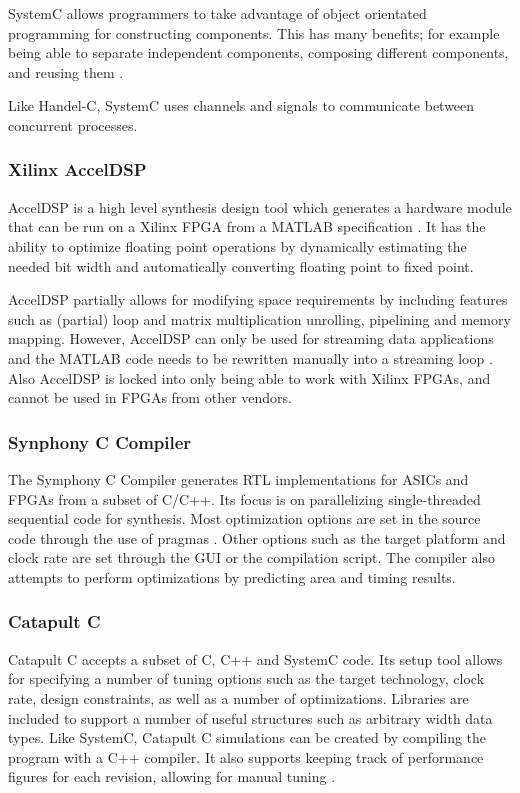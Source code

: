 SystemC allows programmers to take advantage of object orientated programming for
constructing components. This has many benefits; for example being able to separate
independent components, composing different components, and reusing them \cite{systemc3}. 

Like Handel-C, SystemC uses channels and signals to communicate between concurrent processes.



\subsubsection{Xilinx AccelDSP}
AccelDSP is a high level synthesis design tool which generates a hardware module that can be run
on a Xilinx FPGA from a MATLAB specification \cite{accel}. It has the ability to optimize floating
point operations by dynamically estimating the needed bit width and automatically converting floating
point to fixed point.  

AccelDSP partially allows for modifying space requirements by including features such as (partial) loop
and matrix multiplication unrolling, pipelining and memory mapping.
However, AccelDSP can only be used for streaming data applications and the MATLAB code 
needs to be rewritten manually into a streaming loop \cite{hlstools}. Also AccelDSP is locked
into only being able to work with Xilinx FPGAs, and cannot be used in FPGAs from other vendors.


\subsubsection{Synphony C Compiler}
The Symphony C Compiler\cite{syn} generates RTL implementations for ASICs and FPGAs
from a subset of C/C++. Its focus is on parallelizing single-threaded sequential code for
synthesis. Most optimization options are set in the source code through the use of pragmas \cite{hlstools}.
Other options such as the target platform and clock rate are set through the GUI or the
compilation script. The compiler also attempts to perform optimizations by predicting
area and timing results.


\subsubsection{Catapult C}
Catapult C\cite{catapult} accepts a subset of C, C++ and SystemC code. Its setup tool allows for specifying 
a number of tuning options such as the target technology, clock rate, design constraints, as well as a number 
of optimizations. Libraries are included to support a number of useful structures such as arbitrary width data types.
Like SystemC, Catapult C simulations can be created by compiling the program with a C++ compiler. 
It also supports keeping track of performance figures for each revision, allowing for manual tuning \cite{hlstools}.





